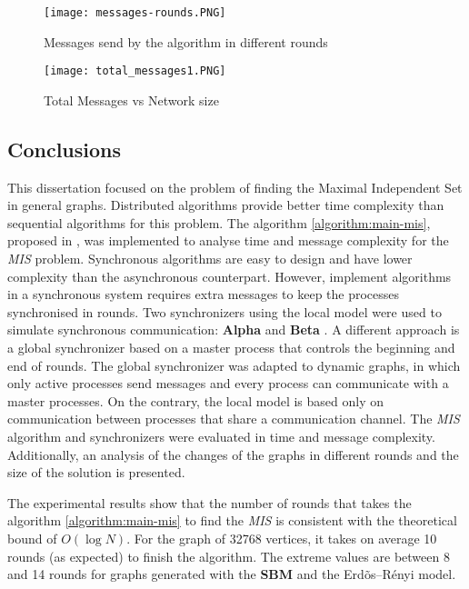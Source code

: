\begin{figure}[ht]
\centering
\texttt{[image: messages-rounds.PNG]} 
\caption{Messages send by the algorithm in different rounds}
\label{fig:total_msg-round}
\end{figure}

\begin{figure}[ht]
\centering
\texttt{[image: total\_messages1.PNG]} 
\caption{Total Messages vs Network size}
\label{fig:total_msg-size}
\end{figure}

\FloatBarrier
\subsection{Conclusions}

This dissertation focused on the problem of finding the Maximal Independent Set in general graphs. Distributed algorithms provide better time complexity than sequential algorithms for this problem.  The algorithm \ref{algorithm:main-mis}, proposed in \cite{yves2009optimal}, was implemented to analyse time and message complexity for the \textit{MIS} problem. Synchronous algorithms are easy to design and have lower complexity than the asynchronous counterpart. However, implement algorithms in a synchronous system requires extra messages to keep the processes synchronised in rounds. Two synchronizers using the local model were used to simulate synchronous communication: \textbf{Alpha} and \textbf{Beta} \cite{awerbuch1985complexity}.  A different approach is a global synchronizer based on a master process that controls the beginning and end of rounds. The global synchronizer was adapted to dynamic graphs, in which only active processes send messages and every process can communicate with a master processes. On the contrary, the local model is based only on communication between processes that share a communication channel. The \textit{MIS} algorithm and synchronizers were evaluated in time and message complexity. Additionally, an analysis of the changes of the graphs in different rounds and the size of the solution is presented. 

The experimental results show that the number of rounds that takes the algorithm \ref{algorithm:main-mis} to find the \textit{MIS} is consistent with the theoretical bound of $O(\log N)$. For the graph of 32768 vertices, it takes on average 10 rounds (as expected) to finish the algorithm. The extreme values are between 8 and 14 rounds for graphs generated with the \textbf{SBM} and the Erd\~os--R\'enyi model.  


